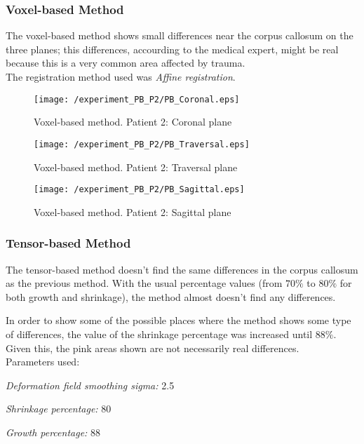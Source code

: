 \subsubsection{Voxel-based Method}
The voxel-based method shows small differences near the corpus
callosum on the three planes; this differences, accourding to the
medical expert, might be real because this is a very common area
affected by trauma.\\

The registration method used was \textit{Affine registration}.

\begin{figure}[H]
  \centering
  \texttt{[image: /experiment\_PB\_P2/PB\_Coronal.eps]}
  \caption{Voxel-based method. Patient 2: Coronal plane}
  \label{PB_Coronal}
\end{figure}

\begin{figure}[H]
  \centering
  \texttt{[image: /experiment\_PB\_P2/PB\_Traversal.eps]}
  \caption{Voxel-based method. Patient 2: Traversal plane}
  \label{PB_Traversal}
\end{figure}

\begin{figure}[H]
  \centering
  \texttt{[image: /experiment\_PB\_P2/PB\_Sagittal.eps]}
  \caption{Voxel-based method. Patient 2: Sagittal plane}
  \label{PB_Sagittal}
\end{figure}


\subsubsection{Tensor-based Method}
The tensor-based method doesn't find the same differences in the corpus
callosum as the previous method. With the usual percentage values
(from $70\%$ to $80\%$ for both growth and shrinkage), the method almost
doesn't find any differences. 

In order to show some of the possible places where the method shows
some type of differences, the value of the shrinkage percentage was
increased until $88\%$. Given this, the pink areas shown are not
necessarily real differences.\\

Parameters used:
\begin{description}
\item \textit{Deformation field smoothing sigma:} 2.5
\item \textit{Shrinkage percentage:} 80
\item \textit{Growth percentage:} 88
\end{description}

